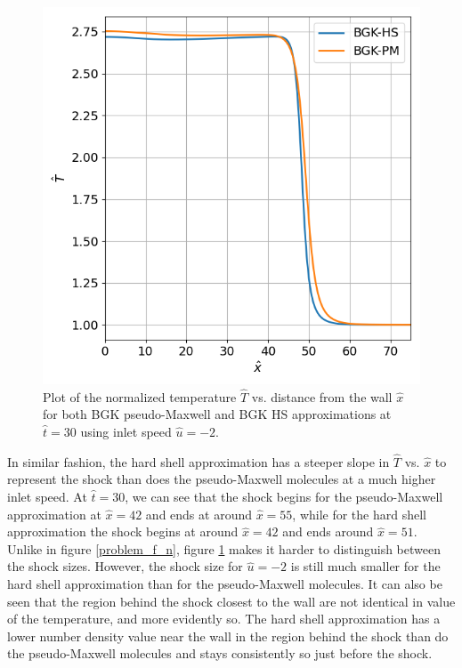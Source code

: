 \documentclass[a4paper]{article}
\begin{document}
\clearpage
\begin{figure}[hbt!]
    \centering
    \includegraphics[width=14cm]{plots/problem_f_T.png}
    \caption{\centering Plot of the normalized temperature $\hat{T}$ vs. distance from the wall $\hat{x}$ for both BGK pseudo-Maxwell and BGK HS approximations at $\hat{t} = 30$ using inlet speed $\hat{u} = -2$.}
    \label{problem_f_T}
\end{figure}
In similar fashion, the hard shell approximation has a steeper slope in $\hat{T}$ vs. $\hat{x}$ to represent the shock than does the pseudo-Maxwell molecules at a much higher inlet speed. At $\hat{t} = 30$, we can see that the shock begins for the pseudo-Maxwell approximation at $\hat{x} = 42$ and ends at around $\hat{x} = 55$, while for the hard shell approximation the shock begins at around $\hat{x} = 42$ and ends around $\hat{x} = 51$. Unlike in figure \ref{problem_f_n}, figure \ref{problem_f_T} makes it harder to distinguish between the shock sizes. However, the shock size for  $\hat{u} = -2$ is still much smaller for the hard shell approximation than for the pseudo-Maxwell molecules. It can also be seen that the region behind the shock closest to the wall are not identical in value of the temperature, and more evidently so. The hard shell approximation has a lower number density value near the wall in the region behind the shock than do the pseudo-Maxwell molecules and stays consistently so just before the shock.   
\clearpage
\end{document}
